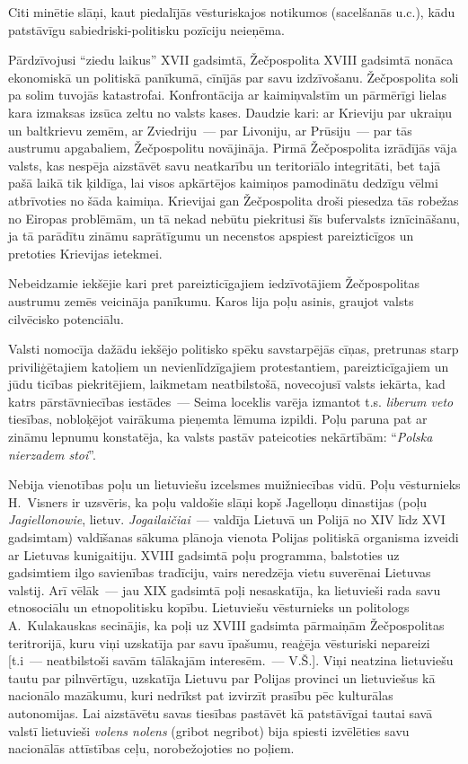 \documentclass[twoside,a5paper,12pt,fleqn,openany]{extbook}
\newcommand{\pltxti}[1]{\textit{\textpolish{#1}}}
\newcommand{\lttxti}[1]{\textit{\textlithuanian{#1}}}
\newcommand{\latxti}[1]{\textit{\textlatin{#1}}}
\begin{document}
Citi minētie slāņi, kaut piedalījās vēsturiskajos notikumos (sacelšanās u.c.), kādu patstāvīgu sabiedriski-politisku pozīciju neieņēma.

Pārdzīvojusi ``ziedu laikus'' XVII gadsimtā, Žečpospolita XVIII gadsimtā nonāca ekonomiskā un politiskā panīkumā, cīnījās par savu izdzīvošanu. Žečpospolita soli pa solim tuvojās katastrofai. Konfrontācija ar kaimiņvalstīm un pārmērīgi lielas kara izmaksas izsūca zeltu no valsts kases. Daudzie kari: ar Krieviju par ukraiņu un baltkrievu zemēm, ar Zviedriju~--- par Livoniju, ar Prūsiju~--- par tās austrumu apgabaliem, Žečpospolitu novājināja. Pirmā Žečpospolita izrādījās vāja valsts, kas nespēja aizstāvēt savu neatkarību un teritoriālo integritāti, bet tajā pašā laikā tik ķildīga, lai visos apkārtējos kaimiņos pamodinātu dedzīgu vēlmi atbrīvoties no šāda kaimiņa. Krievijai gan Žečpospolita droši piesedza tās robežas no Eiropas problēmām, un tā nekad nebūtu piekritusi šīs bufervalsts iznīcināšanu, ja tā parādītu zināmu saprātīgumu un necenstos apspiest pareizticīgos un pretoties Krievijas ietekmei.

Nebeidzamie iekšējie kari pret pareizticīgajiem iedzīvotājiem Žečpospolitas austrumu zemēs veicināja panīkumu. Karos lija poļu asinis, graujot valsts cilvēcisko potenciālu.

Valsti nomocīja dažādu iekšējo politisko spēku savstarpējās cīņas, pretrunas starp priviliģētajiem katoļiem un nevienlīdzīgajiem protestantiem, pareizticīgajiem un jūdu ticības piekritējiem, laikmetam neatbilstošā, novecojusī valsts iekārta, kad katrs pārstāvniecības iestādes~--- Seima loceklis varēja izmantot t.s. \latxti{liberum veto} tiesības, nobloķējot vairākuma pieņemta lēmuma izpildi. Poļu paruna pat ar zināmu lepnumu konstatēja, ka valsts pastāv pateicoties nekārtībām: ``\pltxti{Polska nierzadem stoi}''.

Nebija vienotības poļu un lietuviešu izcelsmes muižniecības vidū. Poļu vēsturnieks H.~Visners ir uzsvēris, ka poļu valdošie slāņi kopš Jagelloņu dinastijas (poļu \pltxti{Jagiellonowie}, lietuv. \lttxti{Jogailaičiai}~--- valdīja Lietuvā un Polijā no XIV līdz XVI gadsimtam) valdīšanas sākuma plānoja vienota Polijas politiskā organisma izveidi ar Lietuvas kunigaitiju. XVIII gadsimtā poļu programma, balstoties uz gadsimtiem ilgo savienības tradīciju, vairs neredzēja vietu suverēnai Lietuvas valstij. Arī vēlāk~--- jau XIX gadsimtā poļi nesaskatīja, ka lietuvieši rada savu etnosociālu un etnopolitisku kopību. Lietuviešu vēsturnieks un politologs A.~Kulakauskas secinājis, ka poļi uz XVIII gadsimta pārmaiņām Žečpospolitas teritrorijā, kuru viņi uzskatīja par savu īpašumu, reaģēja vēsturiski nepareizi [t.i~--- neatbilstoši savām tālākajām interesēm.~--- V.Š.]. Viņi neatzina lietuviešu tautu par pilnvērtīgu, uzskatīja Lietuvu par Polijas provinci un lietuviešus kā nacionālo mazākumu, kuri nedrīkst pat izvirzīt prasību pēc kulturālas autonomijas. Lai aizstāvētu savas tiesības pastāvēt kā patstāvīgai tautai savā valstī lietuvieši \lttxti{volens nolens} (gribot negribot) bija spiesti izvēlēties savu nacionālās attīstības ceļu, norobežojoties no poļiem.
\end{document}
